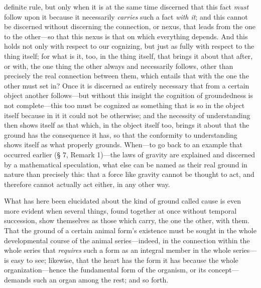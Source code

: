\documentclass[12pt,a4paper]{book}
\begin{document}
definite rule, but only when it is at the same time discerned that this fact \emph{must}
follow upon it because it necessarily \emph{carries} such a fact \emph{with it}; and this cannot be
discerned without discerning the connection, or nexus, that leads from the one to
the other---so that this nexus is that on which everything depends. And this holds
not only with respect to our cognizing, but just as fully with respect to the thing
itself; for what is it, too, in the thing itself, that brings it about that after, or
with, the one thing the other always and necessarily follows, other than precisely
the real connection between them, which entails that with the one the other must set
in? Once it is discerned as entirely necessary that from a certain object another
follows---but without this insight the cognition of groundedness is not
complete---this too must be cognized as something that is so in the object itself
because in it it could not be otherwise; and the necessity of understanding then
shows itself as that which, in the object itself too, brings it about that the
ground has the consequence it has, so that the conformity to understanding shows
itself as what properly grounds. When---to go back to an example that occurred
earlier (§ 7, Remark 1)---the laws of gravity are explained and discerned by a
mathematical speculation, what else can be named as their real ground in nature than
precisely this: that a force like gravity cannot be thought to act, and therefore
cannot actually act either, in any other way.

What has here been elucidated about the kind of ground called cause is even more
evident when several things, found together at once without temporal succession,
show themselves as those which carry, the one the other, with them. That the ground
of a certain animal form's existence must be sought in the whole developmental
course of the animal series---indeed, in the connection within the whole series that
\emph{requires} such a form as an integral member in the whole series---is easy to see;
likewise, that the heart has the form it has because the whole organization---hence
the fundamental form of the organism, or its concept---demands such an organ among
the rest; and so forth.
\end{document}
